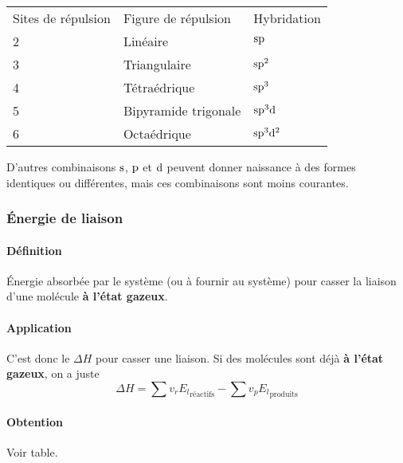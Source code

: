 \begin{center}
	\begin{tabular}{lll}
		Sites de répulsion & Figure de répulsion & Hybridation\\
		2 & Linéaire & $\mathrm{s}\mathrm{p}$\\
		3 & Triangulaire & $\mathrm{s}\mathrm{p}^2$\\
		4 & Tétraédrique & $\mathrm{s}\mathrm{p}^3$\\
		5 & Bipyramide trigonale & $\mathrm{s}\mathrm{p}^3\mathrm{d}$\\
		6 & Octaédrique & $\mathrm{s}\mathrm{p}^3\mathrm{d}^2$\\
	\end{tabular}
\end{center}

D'autres combinaisons $\mathrm{s}$, $\mathrm{p}$ et $\mathrm{d}$ peuvent donner naissance à des formes identiques ou différentes, mais ces combinaisons sont moins courantes.

\subsubsection{\'Energie de liaison}
\label{sec:E_l}

\paragraph{Définition}
\'Energie absorbée par le système (ou à fournir au système) pour casser la liaison d'une molécule \textbf{à l'état gazeux}.

\paragraph{Application}
C'est donc le $\Delta H$ pour casser une liaison.
Si des molécules sont déjà \textbf{à l'état gazeux}, on a juste
\[ \Delta H = \sum v_r{E_l}_\mathrm{réactifs} - \sum v_p{E_l}_\mathrm{produits} \]

\paragraph{Obtention}
Voir table.

